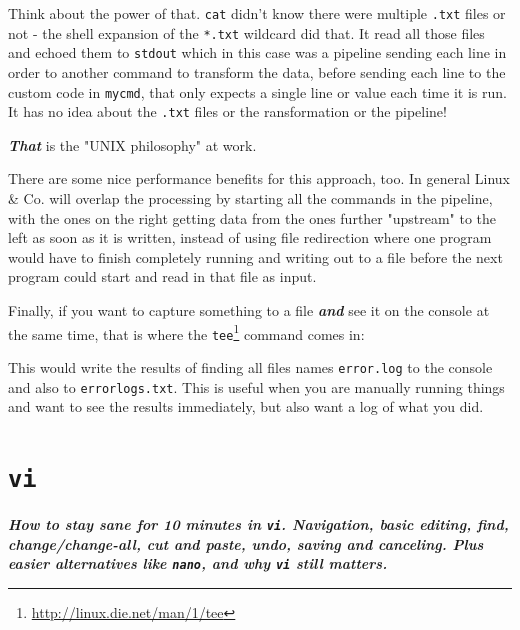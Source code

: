 \documentclass[10pt,american,]{book}
\makeatletter
\newenvironment{Shaded}{\begin{snugshade}}{\end{snugshade}}
\newcommand{\KeywordTok}[1]{\textcolor[rgb]{0.13,0.29,0.53}{\textbf{{#1}}}}
\newcommand{\NormalTok}[1]{{#1}}
\renewcommand{\href}[2]{#2\footnote{\url{#1}}}
\numberwithin{figure}{chapter}
\DeclareRobustCommand{\drcmd}[1]{\index{commands!#1@\texttt{#1}}}
\renewcommand{\KeywordTok}[1]{{#1}}
\renewcommand{\NormalTok}[1]{{#1}}
\makeatother
\begin{document}
Think about the power of that. \texttt{cat} didn't know there were
multiple \texttt{.txt} files or not - the shell expansion of the
\texttt{*.txt} wildcard did that. It read all those files and echoed
them to \texttt{stdout} which in this case was a pipeline sending each
line in order to another command to transform the data, before sending
each line to the custom code in \texttt{mycmd}, that only expects a
single line or value each time it is run. It has no idea about the
\texttt{.txt} files or the ransformation or the pipeline!

\textbf{\emph{That}} is the "UNIX philosophy" at work.

There are some nice performance benefits for this approach, too. In
general Linux \& Co. will overlap the processing by starting all the
commands in the pipeline, with the ones on the right getting data from
the ones further "upstream" to the left as soon as it is written,
instead of using file redirection where one program would have to finish
completely running and writing out to a file before the next program
could start and read in that file as input.

Finally, if you want to capture something to a file \textbf{\emph{and}}
see it on the console at the same time, that is where the
\href{http://linux.die.net/man/1/tee}{\texttt{tee}}\drcmd{tee} command
comes in:

\begin{Shaded}
\end{Shaded}

This would write the results of finding all files names
\texttt{error.log} to the console and also to \texttt{errorlogs.txt}.
This is useful when you are manually running things and want to see the
results immediately, but also want a log of what you did.

\hypertarget{vi}{\chapter{\texorpdfstring{\texttt{vi}}{vi}}\label{vi}}

\textbf{\emph{How to stay sane for 10 minutes in \texttt{vi}.
Navigation, basic editing, find, change/change-all, cut and paste, undo,
saving and canceling. Plus easier alternatives like \texttt{nano}, and
why \texttt{vi} still matters.}}
\end{document}
